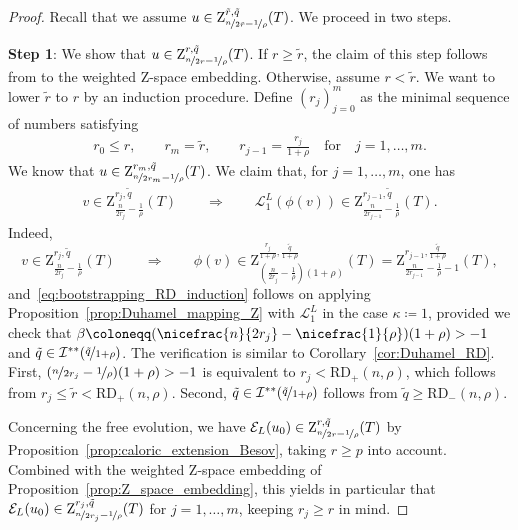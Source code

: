 \documentclass[11pt, leqno]{amsart}
\theoremstyle{definition}
\newcommand{\Z}{\mathrm{Z}}
\newcommand{\Ext}{\mathcal{E}}
\newcommand{\Soll}{\mathcal{L}}
\newcommand{\RD}{\mathrm{RD}}
\newcommand{\SobSet}{\mathcal{I}}
\begin{document}
	\begin{proof}
		Recall that we assume $u \in \Z^{\tilde r, \tilde q}_{\nicefrac{n}{2\tilde r} - \nicefrac{1}{\rho}}(T)$. We proceed in two steps.


		\textbf{Step 1}: We show that $u \in \Z^{r, \tilde q}_{\nicefrac{n}{2r} - \nicefrac{1}{\rho}}(T)$.
		If $r\ge \tilde r$, the claim of this step follows from to the weighted $\Z$-space embedding.
		Otherwise, assume $r<\tilde r$. We want to lower $\tilde r$ to $r$ by an induction procedure. Define $(r_j)_{j=0}^m$ as the minimal sequence of numbers satisfying
		\begin{align}
			r_0 \leq r, \qquad r_m = \tilde r, \qquad
			r_{j-1} = \frac{r_j}{1+\rho} \quad \text{for} \quad j = 1, \dots, m.
		\end{align}
		We know that $u\in \Z^{r_m, \tilde q}_{\nicefrac{n}{2r_m} - \nicefrac{1}{\rho}}(T)$. We claim that, for {$j = 1,\dots,m$}, one has
		\begin{align}
			\label{eq:bootstrapping_RD_induction}
			v\in \Z^{r_j, \tilde q}_{\frac{n}{2r_j} - \frac{1}{\rho}}(T) \qquad \Longrightarrow \qquad \Soll^L_1(\phi(v)) \in \Z^{r_{j-1}, \tilde q}_{\frac{n}{2r_{j-1}} - \frac{1}{\rho}}(T).
		\end{align}
		Indeed, $$v\in \Z^{r_j, \tilde q}_{\frac{n}{2r_j} - \frac{1}{\rho}}(T) \qquad \Longrightarrow \qquad \phi(v) \in \Z^{\frac{r_{j}}{1+\rho}, \frac{\tilde q}{1+\rho}}_{(\frac{n}{2r_j} - \frac{1}{\rho})(1+\rho)}(T) = \Z^{r_{j-1}, \frac{\tilde q}{1+\rho}}_{\frac{n}{2r_{j-1}} - \frac{1}{\rho} - 1}(T),$$
		and~\eqref{eq:bootstrapping_RD_induction} follows on applying Proposition~\ref{prop:Duhamel_mapping_Z} with $\Soll^L_1$ in the case $\kappa \coloneqq 1$, provided we check that $\beta\coloneqq(\nicefrac{n}{2r_j} - \nicefrac{1}{\rho})(1+\rho) > -1$
		and $\tilde q \in \SobSet^{**}(\nicefrac{\tilde q}{1+\rho})$. The verification is similar to Corollary~\ref{cor:Duhamel_RD}. First,
		 $(\nicefrac{n}{2r_j} - \nicefrac{1}{\rho})(1+\rho) > -1$ is equivalent to $r_j < \RD_{+}(n,\rho)$, which follows from $r_j \leq \tilde r < \RD_{+}(n,\rho)$. %
		 Second, $\tilde q \in \SobSet^{**}(\nicefrac{\tilde q}{1+\rho})$
		follows from $\tilde q \geq \RD_{-}(n, \rho)$.

		Concerning the free evolution, we have $\Ext_L(u_0) \in \Z^{r, \tilde q}_{\nicefrac{n}{2r} - \nicefrac{1}{\rho}}(T)$ by Proposition~\ref{prop:caloric_extension_Besov}, taking $r \geq p$ into account.
		Combined with the weighted $\Z$-space embedding of Proposition~\ref{prop:Z_space_embedding}, this yields in particular that $\Ext_L(u_0) \in \Z^{r_j, \tilde q}_{\nicefrac{n}{2r_j} - \nicefrac{1}{\rho}}(T)$ for $j = 1, \dots, m$, keeping $r_j \geq r$ in mind.


\end{proof}
\end{document}
